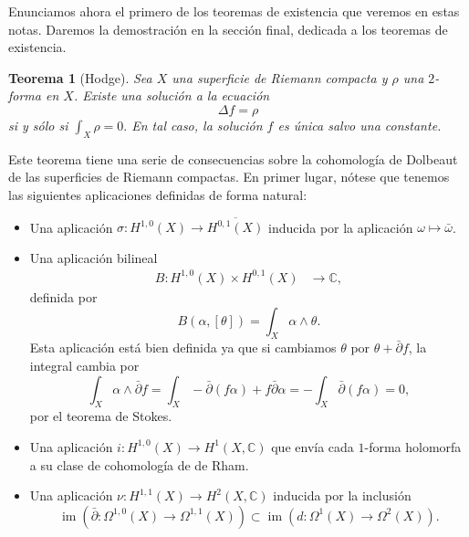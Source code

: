 \documentclass[12pt,a4paper]{article}
\newtheorem{thm}{Teorema}[section]
\theoremstyle{definition} \newtheorem{defn}[thm]{Definición}
\theoremstyle{definition} \newtheorem{ejemplo}[thm]{Ejemplo}
\theoremstyle{definition} \newtheorem{ejercicio}[thm]{Ejercicio}
\def\CC{\mathbb{C}}
\def\delbar{\bar{\partial}}
\DeclareMathOperator{\im}{im}
\begin{document}
Enunciamos ahora el primero de los teoremas de existencia que veremos en estas notas. Daremos la demostración en la sección final, dedicada a los teoremas de existencia.

\begin{thm}[Hodge]
  Sea $X$ una superficie de Riemann compacta y $\rho$ una $2$-forma en $X$. Existe una solución a la ecuación $$\Delta f=\rho$$
  si y sólo si $\int_X \rho = 0.$
  En tal caso, la solución $f$ es única salvo una constante.
\end{thm}

Este teorema tiene una serie de consecuencias sobre la cohomología de Dolbeaut de las superficies de Riemann compactas. En primer lugar, nótese que tenemos las siguientes aplicaciones definidas de forma natural:
\begin{itemize}
  \item Una aplicación $\sigma: H^{1,0}(X) \rightarrow \overline{H^{0,1}(X)}$ inducida por la aplicación $\omega \mapsto \bar{\omega}$.
  \item Una aplicación bilineal
    \begin{align*}
      B :H^{1,0}(X) \times H^{0,1}(X) &\longrightarrow \CC,
      \end{align*}
      definida por
      \begin{equation*}
	B(\alpha,[\theta]) = \int_X \alpha \wedge \theta.
      \end{equation*}
      Esta aplicación está bien definida ya que si cambiamos $\theta$ por $\theta+ \delbar f$, la integral cambia por
      \begin{equation*}
	\int_X \alpha \wedge \delbar f = \int_X -\delbar(f \alpha) + f\delbar \alpha=-\int_X \delbar(f\alpha)=0,
      \end{equation*}
      por el teorema de Stokes.

    \item Una aplicación $i:H^{1,0}(X) \rightarrow H^1(X,\CC)$ que envía cada $1$-forma holomorfa a su clase de cohomología de de Rham.

    \item Una aplicación $\nu: H^{1,1}(X) \rightarrow H^2(X,\CC)$ inducida por la inclusión
      \begin{equation*}
	\im(\delbar: \Omega^{1,0}(X) \rightarrow \Omega^{1,1}(X)) \subset \im(d:\Omega^1(X)\rightarrow \Omega^2(X)).
      \end{equation*}
\end{itemize}
\end{document}
